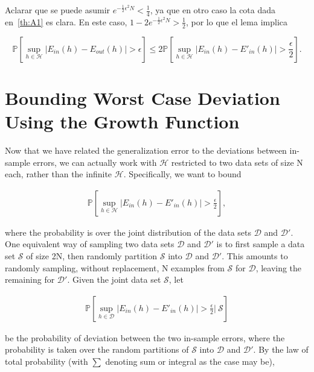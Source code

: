   Aclarar que se puede asumir $e^{- \frac{1}{2} \epsilon^2N} < \frac{1}{4}$,
  ya que en otro caso la cota dada en~\ref{th:A1} es clara.
  En este caso, $1 - 2e^{- \frac{1}{2} \epsilon^2N} > \frac{1}{2}$, por lo que
  el lema implica

  \begin{displaymath}
    \mathbb{P} \left[\sup_{h \in \mathcal{H}} | E_{in}(h) - E_{out}(h) | > \epsilon \right] \leq
    2 \mathbb{P} \left[\sup_{h \in \mathcal{H}} | E_{in}(h) - E'_{in}(h) | > \frac{\epsilon}{2} \right].
  \end{displaymath}




\section{Bounding Worst Case Deviation Using the Growth Function}



Now that we have related the generalization error to the deviations between in-sample errors, we can actually work with $\mathcal{H}$ restricted to two data sets of size N each, rather than the infinite $\mathcal{H}$. Specifically, we want to bound

\begin{align}
    \mathbb{P} \left[\sup_{h \in \mathcal{H}} | E_{in}(h) - E'_{in}(h) | > \frac{\epsilon}{2} \right],
\end{align}

where the probability is over the joint distribution of the data sets $\mathcal{D}$ and $\mathcal{D}'$. One equivalent way of sampling two data sets $\mathcal{D}$ and $\mathcal{D}'$ is to first sample a data set $\mathcal{S}$ of size 2N, then randomly partition $\mathcal{S}$ into $\mathcal{D}$ and $\mathcal{D}'$. This amounts to randomly sampling, without replacement, N examples from $\mathcal{S}$ for $\mathcal{D}$, leaving the remaining for $\mathcal{D}'$. Given the joint data set $\mathcal{S}$, let

\begin{align}
    \mathbb{P} \left[\sup_{h \in \mathcal{D}} | E_{in}(h) - E'_{in}(h) | > \frac{\epsilon}{2} \Big\vert \
    \mathcal{S}  \right]
\end{align}

be the probability of deviation between the two in-sample errors, where the probability is taken over the random partitions of $\mathcal{S}$ into $\mathcal{D}$ and $\mathcal{D}'$. By the law of total probability (with $\sum$ denoting sum or integral as the case may be),

